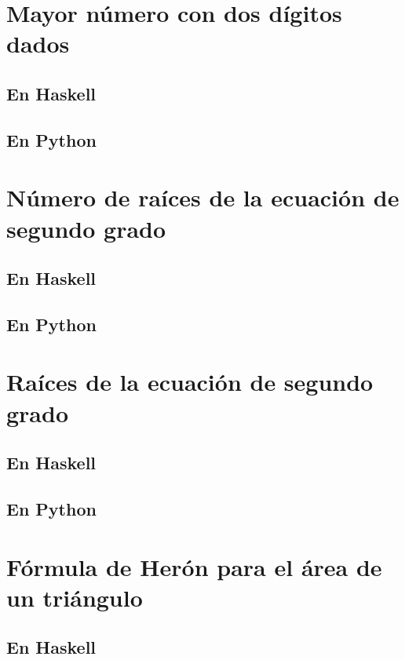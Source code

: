 \documentclass[a4paper,12pt,twoside]{book}
\begin{document}
\section{Mayor número con dos dígitos dados}
\subsection*{En Haskell}
\subsection*{En Python}

\section{Número de raíces de la ecuación de segundo grado}
\subsection*{En Haskell}
\subsection*{En Python}

\section{Raíces de la ecuación de segundo grado}
\subsection*{En Haskell}
\subsection*{En Python}

\section{Fórmula de Herón para el área de un triángulo}
\subsection*{En Haskell}
\end{document}
